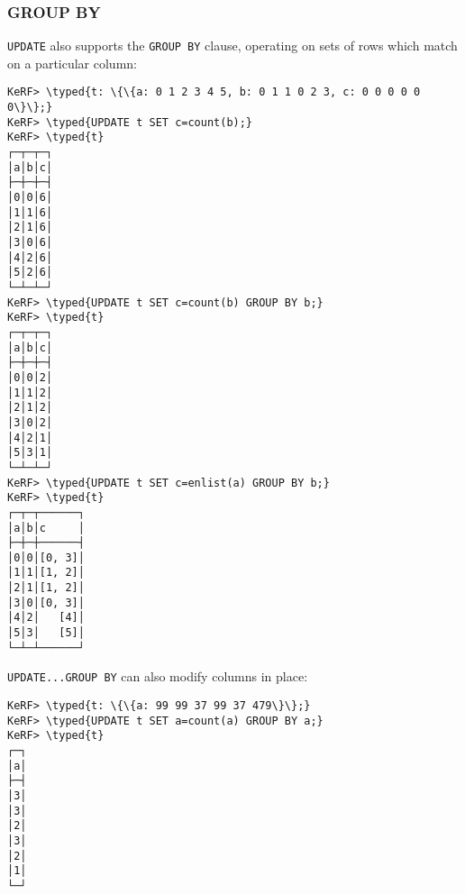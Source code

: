 \documentclass{article}
\newcommand{\typed}[1]{\textcolor{TealBlue}{#1}}
\newcommand{\metasyn}[1]{\texttt{\textbf{#1}}}
\begin{document}
\subsubsection{GROUP BY}
\texttt{UPDATE} also supports the \texttt{GROUP BY} clause, operating on sets of rows which match on a particular column:
\begin{Verbatim}
KeRF> \typed{t: \{\{a: 0 1 2 3 4 5, b: 0 1 1 0 2 3, c: 0 0 0 0 0 0\}\};}
KeRF> \typed{UPDATE t SET c=count(b);}
KeRF> \typed{t}
┌─┬─┬─┐
│a│b│c│
├─┼─┼─┤
│0│0│6│
│1│1│6│
│2│1│6│
│3│0│6│
│4│2│6│
│5│2│6│
└─┴─┴─┘
KeRF> \typed{UPDATE t SET c=count(b) GROUP BY b;}
KeRF> \typed{t}
┌─┬─┬─┐
│a│b│c│
├─┼─┼─┤
│0│0│2│
│1│1│2│
│2│1│2│
│3│0│2│
│4│2│1│
│5│3│1│
└─┴─┴─┘
KeRF> \typed{UPDATE t SET c=enlist(a) GROUP BY b;}
KeRF> \typed{t}
┌─┬─┬──────┐
│a│b│c     │
├─┼─┼──────┤
│0│0│[0, 3]│
│1│1│[1, 2]│
│2│1│[1, 2]│
│3│0│[0, 3]│
│4│2│   [4]│
│5│3│   [5]│
└─┴─┴──────┘
\end{Verbatim}

\pagebreak
\texttt{UPDATE...GROUP BY} can also modify columns in place:
\begin{Verbatim}
KeRF> \typed{t: \{\{a: 99 99 37 99 37 479\}\};}
KeRF> \typed{UPDATE t SET a=count(a) GROUP BY a;}
KeRF> \typed{t}
┌─┐
│a│
├─┤
│3│
│3│
│2│
│3│
│2│
│1│
└─┘
\end{Verbatim}

%
\end{document}
